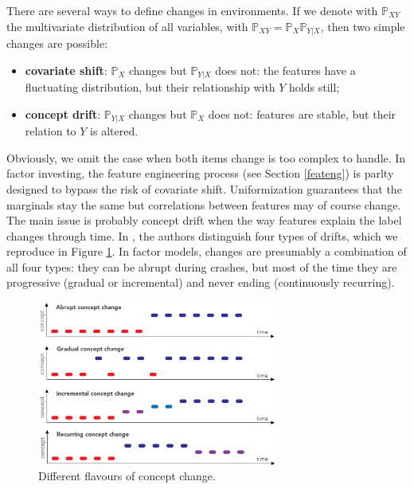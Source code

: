 \documentclass[]{krantz}
\providecommand{\tightlist}{%
  \setlength{\itemsep}{0pt}\setlength{\parskip}{0pt}}
\theoremstyle{definition}
\theoremstyle{definition}
\theoremstyle{definition}
\theoremstyle{remark}
\begin{document}
There are several ways to define changes in environments. If we denote
with \(\mathbb{P}_{XY}\) the multivariate distribution of all variables,
with \(\mathbb{P}_{XY}=\mathbb{P}_{X}\mathbb{P}_{Y|X}\), then two simple
changes are possible:

\begin{itemize}
\tightlist
\item
  \textbf{covariate shift}: \(\mathbb{P}_{X}\) changes but
  \(\mathbb{P}_{Y|X}\) does not: the features have a fluctuating
  distribution, but their relationship with \(Y\) holds still;\\
\item
  \textbf{concept drift}: \(\mathbb{P}_{Y|X}\) changes but
  \(\mathbb{P}_{X}\) does not: features are stable, but their relation
  to \(Y\) is altered.
\end{itemize}

Obviously, we omit the case when both items change is too complex to
handle. In factor investing, the feature engineering process (see
Section \ref{feateng}) is parlty designed to bypass the risk of
covariate shift. Uniformization guarantees that the marginals stay the
same but correlations between features may of course change. The main
issue is probably concept drift when the way features explain the label
changes through time. In \citet{cornuejols2011apprentissage}, the
authors distinguish four types of drifts, which we reproduce in Figure
\ref{fig:conceptchange}. In factor models, changes are presumably a
combination of all four types: they can be abrupt during crashes, but
most of the time they are progressive (gradual or incremental) and never
ending (continuously recurring).

\begin{figure}[H]

{\centering \includegraphics[width=300px]{images/conceptchange} 

}

\caption{Different flavours of concept change.}\label{fig:conceptchange}
\end{figure}
\end{document}
